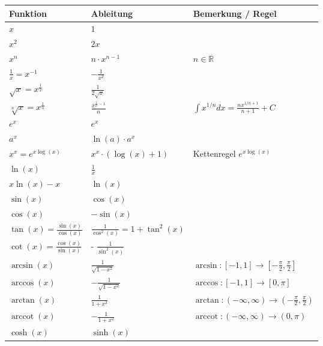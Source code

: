 \documentclass[25pt]{sciposter}
\newcommand{\R}{\mathbb{R}}
\begin{document}
\begin{multicols}{3}




\vfill\null
\columnbreak


{\renewcommand{\arraystretch}{1.5}
	\begin{table}[]
		\begin{tabular}{@{} p{} p{} p{} @{}}
			\toprule
			Funktion & Ableitung & Bemerkung / Regel\\ \midrule
			$x$ & $1$ &   \\
			$x^2$& $2x$ &   \\
			$x^n$& $n\cdot x^{n-1}$ & $n \in \R$  \\
			$\frac{1}{x} = x^{-1}$ & $- \frac{1}{x^2}$ & \\
			$\sqrt{x} = x^{\frac{1}{2}}$ & $\frac{1}{2\sqrt{x}}$ & \\ 
			$\sqrt[n]{x} = x^{\frac{1}{n}}$ & $\frac{x^{\frac{1}{n} -1 }}{n}$ &  $\int x^{1/n} dx = \frac{n x^{1/n + 1}}{n+1} + C$\\ 
			$e^x$ & $e^x$ & \\
			$a^x$ & $\ln(a) \cdot a^x$& \\
			$x^x = e^{x\log(x)}$ & $x^x \cdot (\log(x) + 1)$ & Kettenregel $e^{x\log(x)}$\\
			$\ln(x)$ & $\frac{1}{x}$ & \\
			$x\ln(x) - x$ & $\ln(x)$ &  \\ \midrule
			$\sin(x)$ & $\cos(x)$ & \\
			$\cos(x)$ & $- \sin(x)$ & \\ 
			$\tan(x) = \frac{\sin(x)}{\cos(x)}$ & $\frac{1}{\cos^2(x)} = 1 + \tan^2(x)$ &\\
			$\cot(x) = \frac{\cos(x)}{\sin(x)}$ & - $\frac{1}{\sin^2(x)}$ & \\ 
			$\arcsin(x)$ & $\frac{1}{\sqrt{1 - x^2}}$ & $ \arcsin : [-1,1] \to [-\frac{\pi}{2},\frac{\pi}{2}]$\\
			$\arccos(x)$ & $ - \frac{1}{\sqrt{1-x^2}}$ & $\arccos : [-1,1] \to [0, \pi]$\\
			$\arctan(x)$ & $\frac{1}{1+x^2}$ & $\arctan:(-\infty, \infty) \to (- \frac{\pi}{2},\frac{\pi}{2})$\\
			$\operatorname{arccot}(x)$ & $ - \frac{1}{1+x^2} $ & $\operatorname{arccot} : (-\infty, \infty) \to (0,\pi)$\\
			\midrule
			$\cosh(x)$ & $\sinh(x)$ &\\

\end{tabular}
\end{table}}
\end{multicols}
\end{document}
